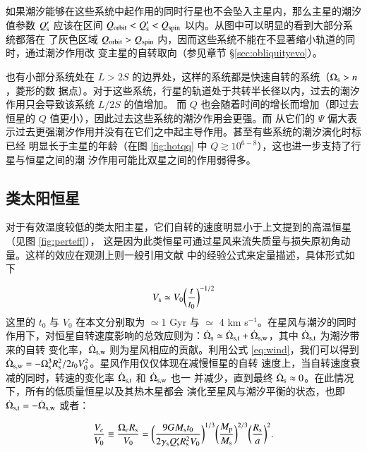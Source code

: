 如果潮汐能够在这些系统中起作用的同时行星也不会坠入主星内，那么主星的潮汐值参数 $Q_\mathrm{s}^\prime$
应该在区间 $Q_\mathrm{orbit} < Q_\mathrm{s}^\prime <  Q_\mathrm{spin}$ 以内。从图中可以明显的看到大部分系统都落在
了灰色区域 $Q_\mathrm{orbit} >  Q_\mathrm{spin}$ 内，因而这些系统不能在不显著缩小轨道的同时，通过潮汐作用改
变主星的自转取向（参见章节 \S \ref{sec:obliquityevo}）。

也有小部分系统处在 $L> 2S$ 的边界处，这样的系统都是快速自转的系统（$\Omega_\mathrm{s} > n$，菱形的数
据点）。对于这些系统，行星的轨道处于共转半长径以内，过去的潮汐作用只会导致该系统 $L/2S$ 的值增加。
而 $Q$ 也会随着时间的增长而增加（即过去恒星的 $Q$ 值更小），因此过去这些系统的潮汐作用会更强。而
从它们的 $\Psi$ 偏大表示过去更强潮汐作用并没有在它们之中起主导作用。甚至有些系统的潮汐演化时标已经
明显长于主星的年龄（在图 \ref{fig:hotqq} 中 $Q \gtrsim 10^{6-8}$），这也进一步支持了行星与恒星之间的潮
汐作用可能比双星之间的作用弱得多\cite{Ogilvie2007}。


\subsection{类太阳恒星} \label{sec:coolstar}

对于有效温度较低的类太阳主星，它们自转的速度明显小于上文提到的高温恒星（见图 \ref{fig:perteff}），
这是因为此类恒星可通过星风来流失质量与损失原初角动量。这样的效应在观测上则一般引用文献
 中的经验公式来定量描述，具体形式如下

\begin{equation} \label{eq:wind}
V_\mathrm{s} \simeq  V_0 \bigg( \frac{t}{t_0} \bigg)^{-1/2}
\end{equation}
这里的 $t_0$ 与 $V_0$ 在本文分别取为 $\simeq$1 Gyr 与 $\simeq$ 4 km s$^{-1}$。在星风与潮汐的同时
作用下\cite{DobbsDixon2004,Dawson2014}，对恒星自转速度影响的总效应则为：$\dot{\Omega}_\mathrm{s} 
\simeq \dot{\Omega}_\mathrm{s, t} + \dot{\Omega}_\mathrm{s, w}$，其中 $\dot{\Omega}_\mathrm{s, t}$ 为潮汐带来的自转
变化率，$\dot{\Omega}_\mathrm{s, w}$ 则为星风相应的贡献。利用公式 \ref{eq:wind}，我们可以得到 
$\dot{\Omega}_\mathrm{s, w} = -\Omega_\mathrm{s}^3 R_\mathrm{s}^2/2 t_0 V_0^2$。星风作用仅仅体现在减慢恒星的自转
速度上，当自转速度衰减的同时，转速的变化率 $ \dot{\Omega}_\mathrm{s, t}$ 和 $\dot{\Omega}_\mathrm{s, w}$ 也一
并减少，直到最终 $ \dot{\Omega}_\mathrm{s} \approx 0 $。在此情况下，所有的低质量恒星以及其热木星都会
演化至星风与潮汐平衡的状态，也即 $\dot{\Omega}_\mathrm{s, t} = - \dot{\Omega}_\mathrm{s, w}$ 或者：

\begin{equation} \label{eq:lmeq}
{V_e \over V_0} \equiv \frac{\Omega_eR_\mathrm{s}}{V_0} = \bigg( \frac{9G M_\mathrm{s}t_0}
{2 \gamma_\mathrm{s}Q_\mathrm{s}^{\prime}R_\mathrm{s}^2V_0} \bigg)^{1/3} \bigg( \frac{M_\mathrm{p}}
{M_\mathrm{s}} \bigg)^{2/3} \bigg( \frac{R_\mathrm{s}}{a} \bigg)^2.
\end{equation}  %


